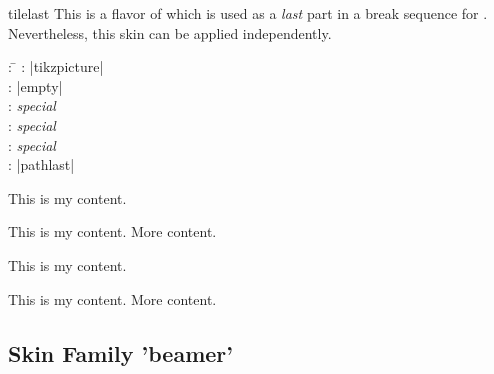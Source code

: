 \clearpage
\begin{docSkin}[doc new=2016-02-25]{tilelast}
This is a flavor of  which is used as a \emph{last} part
in a break sequence for .
Nevertheless, this skin can be applied independently.
\begin{tcolorbox}[skintable=tilelast]
  \begin{tabbing}
    : \=\kill
    :  \> |tikzpicture|\\ 
    :           \> |empty|\\
    : \> \emph{special}\\ 
    :        \> \emph{special}\\
    :    \> \emph{special}\\
    :           \> |pathlast|
  \end{tabbing}
\end{tcolorbox}
\end{docSkin}


\begin{dispExample}
\begin{tcbraster}[skin=tilelast,raster equal height,raster columns=4,
    colback=LightGreen,colframe=DarkGreen,colbacklower=LimeGreen!75!LightGreen,
    colbacktitle=LimeGreen!75!DarkGreen,
    left=1mm,right=1mm,top=1mm,bottom=1mm,middle=1mm,boxrule=0pt]
  \begin{tcolorbox}
    This is my content.
  \end{tcolorbox}
  \begin{tcolorbox}
    This is my content.
    \tcblower
    More content.
  \end{tcolorbox}
  \begin{tcolorbox}[adjusted title=My title]
    This is my content.
  \end{tcolorbox}
  \begin{tcolorbox}[adjusted title=My title]
    This is my content.
    \tcblower
    More content.
  \end{tcolorbox}
\end{tcbraster}
\end{dispExample}



\clearpage
\subsection{Skin Family 'beamer'}

